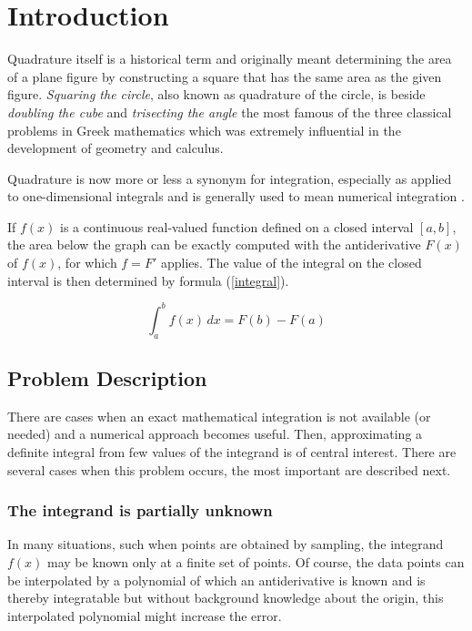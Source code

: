 
\section{Introduction}

Quadrature itself is a historical term and originally meant 
determining the area of a plane figure by constructing a square that 
has the same area as the given figure. \emph{Squaring the circle}, also known as quadrature of the circle, is beside \emph{doubling the cube} and \emph{trisecting the angle} the most famous of the three classical problems in Greek mathematics which was extremely influential in the development of geometry and calculus.

Quadrature is now more or less a synonym for integration, especially as applied to one-dimensional integrals and is generally used to mean numerical integration \cite{Wiki_Integration}.

If $f(x)$ is a continuous real-valued function defined on a closed interval $[a, b]$, the area below the graph can be exactly computed with the antiderivative $F(x)$ of $f(x)$, for which $f = F'$ applies. The value of the integral on the closed interval is then determined by formula (\ref{integral}). \cite{HeuserAnalysis} 

\begin{equation} \label{integral} 	
\int_a^b\! f(x)\, dx = F(b) - F(a) 
\end{equation}



\subsection{Problem Description}
There are cases when an exact mathematical integration is not available (or needed) and a numerical approach becomes useful. Then, approximating a definite integral from few values of the integrand is of central interest. There are several cases when this problem occurs, the most important are described next.

\subsubsection{The integrand is partially unknown}
In many situations, such when points are obtained by sampling, the integrand $f(x)$ may be known only at a finite set of points. Of course, the data points can be interpolated by a polynomial of which an antiderivative is known and is thereby integratable but without background knowledge about the origin, this interpolated polynomial might increase the error. 

